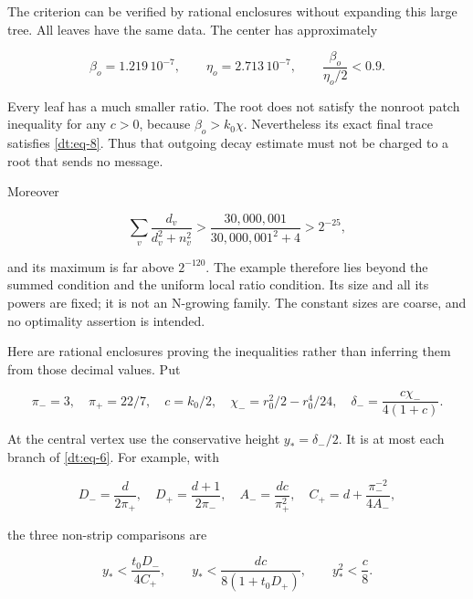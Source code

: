 The criterion can be verified by rational enclosures without expanding this large
tree. All leaves have the same data. The center has approximately

\begin{equation}\label{dt:eq-54}
\beta_o=1.219\,10^{-7},\qquad
 \eta_o=2.713\,10^{-7},\qquad
       \frac{\beta_o}{\eta_o/2}<0.9.
\end{equation}

Every leaf has a much smaller ratio. The root does not satisfy the
nonroot patch inequality for any \(c>0\), because \(\beta_o>k_0\chi\).
Nevertheless its exact final trace satisfies \eqref{dt:eq-8}. Thus that outgoing
decay estimate must not be charged to a root that sends no message.

Moreover

\begin{equation}\label{dt:eq-55}
\sum_v\frac{d_v}{d_v^2+n_v^2}
       >\frac{30,000,001}{30,000,001^2+4}>2^{-25},
\end{equation}

and its maximum is far above \(2^{-120}\). The example therefore lies beyond
the summed condition and the uniform local ratio condition. Its size and all its powers
are fixed; it is not an N-growing family. The constant sizes are coarse,
and no optimality assertion is intended.

Here are rational enclosures proving the inequalities rather than
inferring them from those decimal values. Put

\begin{equation}\label{dt:eq-56}
\pi_- =3,\quad \pi_+=22/7,\quad c=k_0/2,\quad
 \chi_-=r_0^2/2-r_0^4/24,\quad
 \delta_- =\frac{c\chi_-}{4(1+c)}.
\end{equation}

At the central vertex use the conservative height
\(y_* =\delta_-/2\). It is at most each branch of \eqref{dt:eq-6}. For example,
with

\begin{equation}\label{dt:eq-57}
D_- =\frac d{2\pi_+},\quad D_+=\frac{d+1}{2\pi_-},\quad
 A_- =\frac{dc}{\pi_+^2},\quad
 C_+=d+\frac{\pi_-^{-2}}{4A_-},
\end{equation}

the three non-strip comparisons are

\begin{equation}\label{dt:eq-58}
y_*<\frac{t_0D_-}{4C_+},\qquad
 y_*<\frac{dc}{8(1+t_0D_+)},\qquad y_*^2<\frac c8.
\end{equation}

